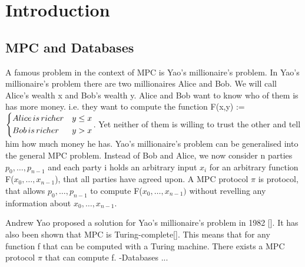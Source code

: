 \chapter {Introduction}
\section{MPC and Databases}
A famous problem in the context of MPC is Yao's millionaire's problem. In Yao's millionaire's problem there are two millionaires Alice and Bob. We will call Alice's wealth x and Bob's wealth y. Alice and Bob want to know who of them is has more money. i.e. they want to compute the function F(x,y) := $ 
\begin{dcases} 
	Alice \,  is \, richer   &  y \leq  x \\
	Bob \, is \, richer   &  y > x  \\
\end{dcases}  $. Yet neither of them is willing to trust the other and tell him how much money he has. 
Yao's millionaire's problem can be generalised into the general MPC problem.  Instead of Bob and Alice, we now consider n parties $ p_0,\dots,p_{n-1} $ and each party i holds an arbitrary input  $ x_i $ for an arbitrary function F($ x_0,\dots,x_{n-1}$),  that all parties have agreed upon.  
A MPC protocol $ \pi $  is protocol, that allows  $ p_0,\dots,p_{n-1} $ to compute F($ x_0,\dots,x_{n-1} )$ without revelling any information about $ x_0,\dots,x_{n-1}. $
       

             
Andrew Yao proposed a solution for Yao's millionaire's problem in 1982 [].  It has also been shown that MPC is Turing-complete[]. This means that for any function f that can be computed with a Turing machine. There exists a MPC protocol $ \pi $ that can compute f.    
-Databases ...








